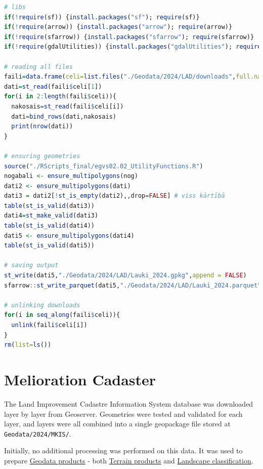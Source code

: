 \documentclass[
]{book}
\newcommand{\passthrough}[1]{#1}
\begin{document}
\begin{lstlisting}[language=R]
# libs
if(!require(sf)) {install.packages("sf"); require(sf)}
if(!require(arrow)) {install.packages("arrow"); require(arrow)}
if(!require(sfarrow)) {install.packages("sfarrow"); require(sfarrow)}
if(!require(gdalUtilities)) {install.packages("gdalUtilities"); require(gdalUtilities)}

# reading all files
faili=data.frame(celi=list.files("./Geodata/2024/LAD/downloads",full.names = TRUE))
dati=st_read(faili$celi[1])
for(i in 2:length(faili$celi)){
  nakosais=st_read(faili$celi[i])
  dati=bind_rows(dati,nakosais)
  print(nrow(dati))
}

# ensuring geometries
source("./RScripts_final/egvs02.02_UtilityFunctions.R")
nogabali <- ensure_multipolygons(nog)
dati2 <- ensure_multipolygons(dati)
dati3 = dati2[!st_is_empty(dati2),,drop=FALSE] # viss kārtībā
table(st_is_valid(dati3)) 
dati4=st_make_valid(dati3)
table(st_is_valid(dati4))
dati5 <- ensure_multipolygons(dati4)
table(st_is_valid(dati5))

# saving output
st_write(dati5,"./Geodata/2024/LAD/Lauki_2024.gpkg",append = FALSE)
sfarrow::st_write_parquet(dati5,"./Geodata/2024/LAD/Lauki_2024.parquet")

# unlinking downloads
for(i in seq_along(faili$celi)){
  unlink(faili$celi[i])
}
rm(list=ls())
\end{lstlisting}

\section{Melioration Cadaster}\label{Ch04.03}

The Land Improvement Cadastre Information System database was downloaded layer
by layer from Geoserver. Geometries were tested and validated for each layer, and
layers were all combined into a single geopackage file stored at \passthrough{\lstinline!Geodata/2024/MKIS/!}.

Initially, no additional processing was performed on this data. It was used to
prepare \hyperref[Ch05]{Geodata products} - both \hyperref[Ch05.01]{Terrain products} and \hyperref[Ch05.03]{Landscape classification}.
\end{document}
